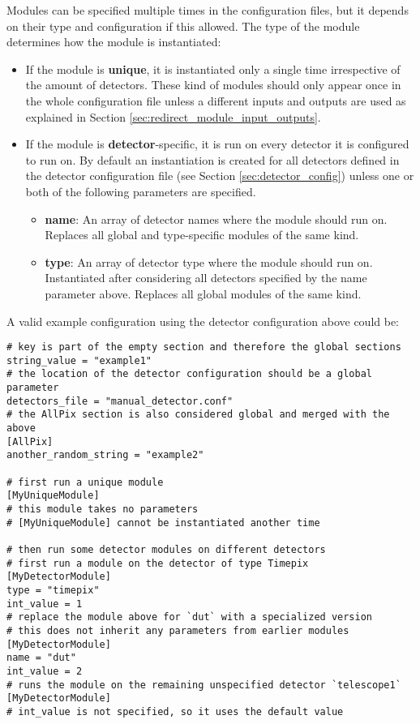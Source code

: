 Modules can be specified multiple times in the configuration files, but it depends on their type and configuration if this allowed. The type of the module determines how the module is instantiated:
\begin{itemize}
\item If the module is \textbf{unique}, it is instantiated only a single time irrespective of the amount of detectors. These kind of modules should only appear once in the whole configuration file unless a different inputs and outputs are used as explained in Section \ref{sec:redirect_module_input_outputs}.
\item If the module is \textbf{detector}-specific, it is run on every detector it is configured to run on. By default an instantiation is created for all detectors defined in the detector configuration file (see Section \ref{sec:detector_config}) unless one or both of the following parameters are specified.
\begin{itemize}
\item \textbf{name}: An array of detector names where the module should run on. Replaces all global and type-specific modules of the same kind.
\item \textbf{type}: An array of detector type where the module should run on. Instantiated after considering all detectors specified by the name parameter above. Replaces all global modules of the same kind. 
\end{itemize}
\end{itemize}

A valid example configuration using the detector configuration above could be:
\begin{verbatim}
# key is part of the empty section and therefore the global sections
string_value = "example1"
# the location of the detector configuration should be a global parameter
detectors_file = "manual_detector.conf"
# the AllPix section is also considered global and merged with the above
[AllPix]
another_random_string = "example2"

# first run a unique module
[MyUniqueModule]
# this module takes no parameters
# [MyUniqueModule] cannot be instantiated another time

# then run some detector modules on different detectors 
# first run a module on the detector of type Timepix
[MyDetectorModule]
type = "timepix"
int_value = 1
# replace the module above for `dut` with a specialized version 
# this does not inherit any parameters from earlier modules
[MyDetectorModule]
name = "dut"
int_value = 2
# runs the module on the remaining unspecified detector `telescope1`
[MyDetectorModule]
# int_value is not specified, so it uses the default value
\end{verbatim}

